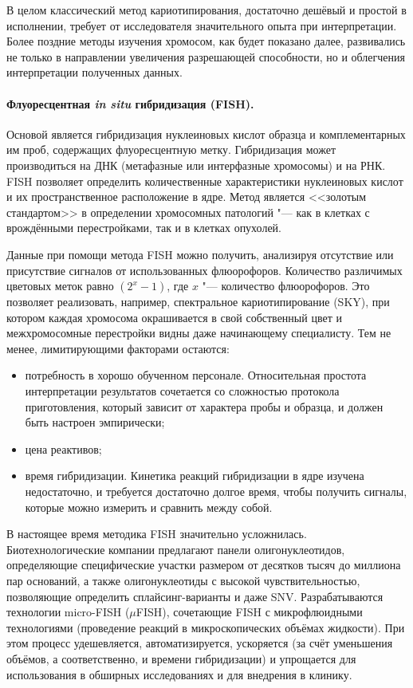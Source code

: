 \documentclass[a4paper,12pt]{article}
\begin{document}
В целом классический метод кариотипирования, достаточно дешёвый и простой в исполнении, требует от исследователя значительного опыта при интерпретации.
Более поздние методы изучения хромосом, как будет показано далее, развивались не только в направлении увеличения разрешающей способности, но и облегчения интерпретации полученных данных.

\paragraph{Флуоресцентная \textit{in situ} гибридизация (FISH).}
Основой является гибридизация нуклеиновых кислот образца и комплементарных им проб, содержащих флуоресцентную метку.
Гибридизация может производиться на ДНК (метафазные или интерфазные хромосомы) и на РНК.
FISH позволяет определить количественные характеристики нуклеиновых кислот и их пространственное расположение в ядре.
Метод является <<золотым стандартом>> в определении хромосомных патологий "--- как в клетках с врождёнными перестройками, так и в клетках опухолей.

Данные при помощи метода FISH можно получить, анализируя отсутствие или присутствие сигналов от использованных флюорофоров.
Количество различимых цветовых меток равно $(2^x - 1)$, где  $x$ "--- количество флюорофоров.
Это позволяет реализовать, например, спектральное кариотипирование (SKY), при котором каждая хромосома окрашивается в свой собственный цвет и межхромосомные перестройки видны даже начинающему специалисту\cite{guo}.
Тем не менее, лимитирующими факторами остаются:

\begin{itemize}
\item потребность в хорошо обученном персонале.
Относительная простота интерпретации результатов сочетается со сложностью протокола приготовления, который зависит от характера пробы и образца, и должен быть настроен эмпирически;
\item цена реактивов;
\item время гибридизации.
Кинетика реакций гибридизации в ядре изучена недостаточно, и требуется достаточно долгое время, чтобы получить сигналы, которые можно измерить и сравнить между собой.
\end{itemize}

В настоящее время методика FISH значительно усложнилась.
Биотехнологические компании предлагают панели олигонуклеотидов, определяющие специфические участки размером от десятков тысяч до миллиона пар оснований, а также олигонуклеотиды с высокой чувствительностью, позволяющие определить сплайсинг-варианты и даже SNV.
Разрабатываются технологии micro-FISH ($\mu$FISH), сочетающие FISH с микрофлюидными технологиями (проведение реакций в микроскопических объёмах жидкости).
При этом процесс удешевляется, автоматизируется, ускоряется (за счёт уменьшения объёмов, а соответственно, и времени гибридизации) и упрощается для использования в обширных исследованиях и для внедрения в клинику\cite{huber}.
\end{document}
